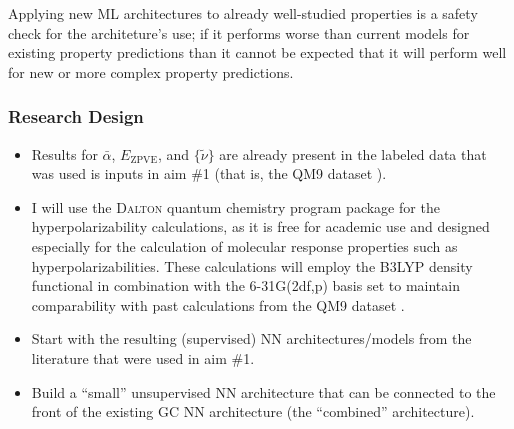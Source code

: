\documentclass[12pt]{article}
\begin{document}
Applying new ML architectures to already well-studied properties is a safety check for the architeture's use; if it performs worse than current models for existing property predictions than it cannot be expected that it will perform well for new or more complex property predictions.


\subsubsection{Research Design}
\label{sec:org37206dc}

\begin{itemize}
\item Results for \(\bar{\alpha}\), \(E_{\text{ZPVE}}\), and \(\{\tilde{\nu}\}\) are already present in the labeled data that was used is inputs in aim \#1 (that is, the QM9 dataset \cite{Ramakrishnan:2014ij}).

\item I will use the \textsc{Dalton} quantum chemistry program package \cite{daltonpaper} for the hyperpolarizability calculations, as it is free for academic use and designed especially for the calculation of molecular response properties such as hyperpolarizabilities. These calculations will employ the B3LYP density functional in combination with the 6-31G(2df,p) basis set to maintain comparability with past calculations from the QM9 dataset \cite{Ramakrishnan:2014ij}.

\item Start with the resulting (supervised) NN architectures/models from the literature that were used in aim \#1.

\item Build a ``small'' unsupervised NN architecture that can be connected to the front of the existing GC NN architecture (the ``combined'' architecture).
\end{itemize}
\end{document}
